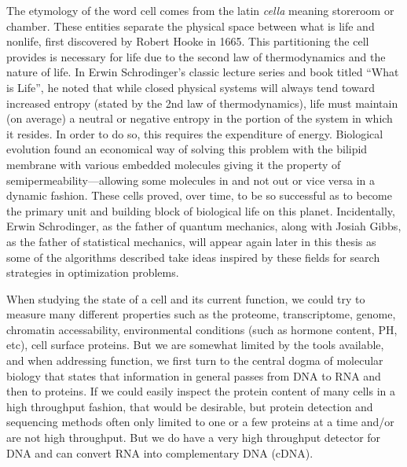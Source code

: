 \par{
The etymology of the word cell comes from the latin \textit{cella} meaning storeroom or chamber. These entities separate the physical space between what is life and nonlife, first discovered by Robert Hooke in 1665\cite{Hooke}. This partitioning the cell provides is necessary for life due to the second law of thermodynamics and the nature of life. In Erwin Schrodinger's classic lecture series and book titled ``What is Life''\cite{whatislife}, he noted that while closed physical systems will always tend toward increased entropy (stated by the 2nd law of thermodynamics\cite{thermodynamics1}\cite{thermodynamics2}\cite{maxwell}), life must maintain (on average) a neutral or negative entropy in the portion of the system in which it resides\cite{informationtheorylife}\cite{astrobiology}\cite{extremalities}. In order to do so, this requires the expenditure of energy. Biological evolution found an economical way of solving this problem with the bilipid membrane with various embedded molecules giving it the property of semipermeability---allowing some molecules in and not out or vice versa in a dynamic fashion. These cells proved, over time, to be so successful as to become the primary unit and building block of biological life on this planet. Incidentally, Erwin Schrodinger, as the father of quantum mechanics, along with Josiah Gibbs, as the father of statistical mechanics, will appear again later in this thesis as some of the algorithms described take ideas inspired by these fields for search strategies in optimization problems.
} 

\par{
When studying the state of a cell and its current function, we could try to measure many different properties such as the proteome, transcriptome, genome, chromatin accessability, environmental conditions (such as hormone content, PH, etc), cell surface proteins. But we are somewhat limited by the tools available, and when addressing function, we first turn to the central dogma of molecular biology\cite{centraldogma} that states that information in general passes from DNA to RNA and then to proteins. If we could easily inspect the protein content of many cells in a high throughput fashion, that would be desirable, but protein detection and sequencing methods often only limited to one or a few proteins at a time and/or are not high throughput\cite{immunohistochemistry}\cite{multiIHC}\cite{westernblot}\cite{western2}\cite{multimassspec}\cite{ionbeam}\cite{cellIHC}\cite{proteinsequencing}. But we do have a very high throughput detector for DNA and can convert RNA into complementary DNA (cDNA).
}

